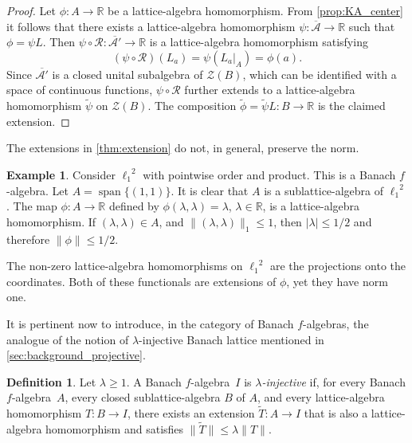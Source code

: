 \documentclass{memo-l}
\theoremstyle{definition}
\newtheorem{defn}[theorem]{Definition}
\newtheorem{example}[theorem]{Example}
\theoremstyle{remark}
\numberwithin{section}{chapter}
\numberwithin{equation}{chapter}
\newcommand\R{\ensuremath{\mathbb{R}}}
\newcommand{\el}[1]{\ensuremath{\ell_{#1}}}
\newcommand{\falg}{$f\!$-algebra}
\DeclareMathOperator{\barespn}{span}
\begin{document}
\begin{proof}
    Let $\phi \colon A\to \R$ be a lattice-algebra homomorphism. From
    \cref{prop:KA_center} it follows that there exists a
    lattice-algebra homomorphism $\psi \colon
    \overline{\mathcal{A}}\to \R$ such that $\phi =\psi L$. Then $\psi  \circ \mathcal{R}\colon \overline{\mathcal{A}'}\to \R$ is a
    lattice-algebra homomorphism satisfying
    \[
        (\psi \circ \mathcal{R})(L_a)=\psi (L_a|_A)=\phi
        (a).
    \]
    Since $\overline{\mathcal{A}'}$ is a closed unital subalgebra of
    $\mathcal{Z}(B)$, which can be identified with a space of
    continuous functions, $\psi \circ \mathcal{R}$ further extends to
    a lattice-algebra homomorphism $\tilde \psi $ on $\mathcal{Z}(B)$.
    The composition $\tilde \phi =\tilde \psi L\colon B\to \R$ is the
    claimed extension.
\end{proof}

The extensions in \cref{thm:extension} do not, in general, preserve
the norm.

\begin{example}\label{ex:extension_not_preserves_norm}
    Consider $\el 1^2$ with pointwise order and product. This is a
    Banach \falg. Let $A=\barespn\{(1,1)\}$. It is clear that $A$ is a
    sublattice-algebra of $\el 1^2$. The map $\phi \colon A\to \R$
    defined by $\phi (\lambda,\lambda )=\lambda $, $\lambda \in \R$,
    is a lattice-algebra homomorphism. If $(\lambda ,\lambda )\in A$,
    and $\|(\lambda ,\lambda )\|_1\le 1$, then $|\lambda |\le 1/2$ and
    therefore $\|\phi \|\le 1/2$.

    The non-zero lattice-algebra homomorphisms on $\el 1^2$ are the
    projections onto the coordinates. Both of these functionals are
    extensions of $\phi $, yet they have norm one.
\end{example}

It is pertinent now to introduce, in the category of Banach \falg s,
the analogue of the notion of $\lambda $-injective Banach lattice
mentioned in \cref{sec:background_projective}.

\begin{defn}
    Let $\lambda \ge 1$.
    A Banach \falg\ $I$ is \emph{$\lambda $-injective} if, for every Banach
    \falg\ $A$, every closed sublattice-algebra $B$ of $A$, and every
    lattice-algebra homomorphism $T \colon B\to I$, there exists an
    extension $\tilde T \colon A\to I$ that is also a
    lattice-algebra homomorphism and satisfies $\|\tilde T\|\le
    \lambda \|T\|$.
\end{defn}
\end{document}
